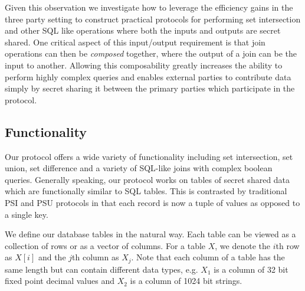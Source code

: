Given this observation we investigate how to leverage the efficiency gains in the three party setting to construct practical protocols for performing set intersection and other SQL like operations where both the inputs and outputs are secret shared. One critical aspect of this input/output requirement is that join operations can then be \emph{composed} together, where the output of a join can be the input to another. Allowing this composability greatly increases the ability to perform highly complex queries and enables external parties to contribute data simply by secret sharing it between the primary parties which participate in the protocol.

\subsection{Functionality}

Our protocol offers a wide variety of functionality including set intersection, set union, set difference and a variety of SQL-like joins with complex boolean queries. Generally speaking, our protocol works on tables of secret shared data which are functionally similar to SQL tables. This is contrasted by traditional PSI and PSU protocols\cite{usenix:PSZ14,USENIX:PSSZ15,PSZ16,CCS:KKRT16} in that each record is now a tuple of values as opposed to a single key. 

We define our database tables in the natural way. Each table can be viewed as a collection of rows or as a vector of columns. For a table $X$, we denote the $i$th row as $X[i]$ and the $j$th column as $X_j$. 
\iffullversion
Note that each column of a table has the same length but can contain different data types, e.g. $X_1$ is a column of 32 bit fixed point decimal values and $X_2$ is a column of 1024 bit strings.

